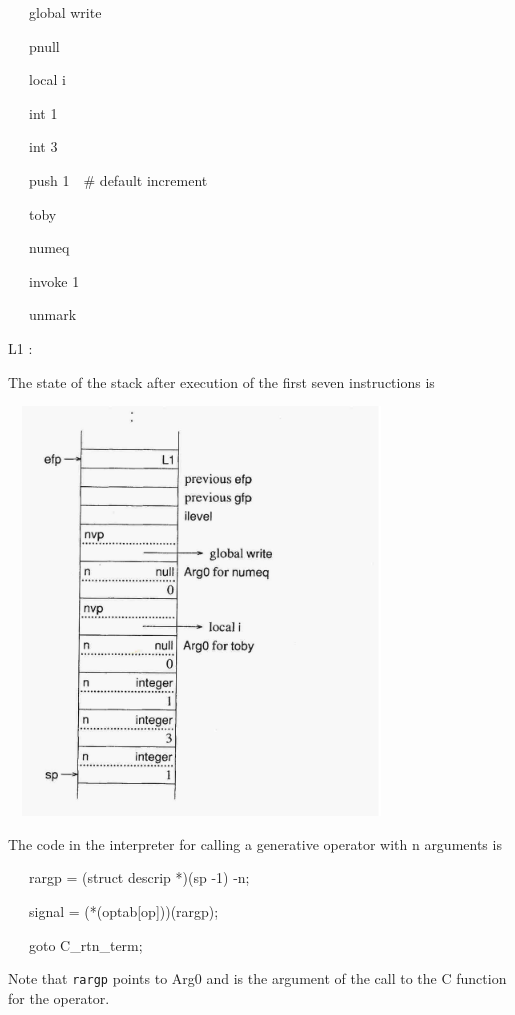 {\ttfamily\mdseries
\ \ \ global write}

{\ttfamily\mdseries
\ \ \ pnull}

{\ttfamily\mdseries
\ \ \ local i}

{\ttfamily\mdseries
\ \ \ int 1}

{\ttfamily\mdseries
\ \ \ int 3}

{\ttfamily\mdseries
\ \ \ push 1\ \ \# default increment}

{\ttfamily\mdseries
\ \ \ toby}

{\ttfamily\mdseries
\ \ \ numeq}

{\ttfamily\mdseries
\ \ \ invoke 1}

{\ttfamily\mdseries
\ \ \ unmark}

{\ttfamily\mdseries
L1 :}


The state of the stack after execution of the first seven instructions is


\ \  \includegraphics[width=3.7402in,height=4.2717in]{ib-img/ib-img067.jpg} 


The code in the interpreter for calling a generative operator with n
arguments is

{\ttfamily\mdseries
\ \ \ rargp = (struct descrip *)(sp -1) -n;}

{\ttfamily\mdseries
\ \ \ signal = (*(optab[op]))(rargp);}

{\ttfamily\mdseries
\ \ \ goto C\_rtn\_term;}


Note that \texttt{rargp} points to Arg0 and is the argument of the
call to the C function for the operator.

